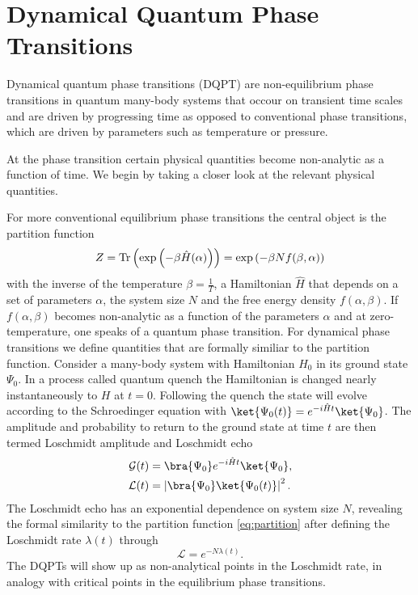\section{Dynamical Quantum Phase Transitions}
Dynamical quantum phase transitions (DQPT) are non-equilibrium phase transitions in quantum many-body systems that occour on transient time scales and are driven by progressing time as opposed to conventional phase transitions, which are driven by parameters such as temperature or pressure. 

At the phase transition certain physical quantities become non-analytic as a function of time. We begin by taking a closer look at the relevant physical quantities.

For more conventional equilibrium phase transitions the central object is the partition function
\begin{equation}
    \label{eq:partition}
    Z = \mathrm{Tr}\left(\exp\left(-\beta\hat{H}(\alpha)\right)\right)= \exp\left(-\beta Nf(\beta,\alpha)\right)
\end{equation}
with the inverse of the temperature $\beta=\frac{1}{T}$, a Hamiltonian $\hat{H}$ that depends on a set of parameters $\alpha$, the system size $N$ and the free energy density $f(\alpha,\beta)$. If $f(\alpha,\beta)$ becomes non-analytic as a function of the parameters $\alpha$ and at zero-temperature, one speaks of a quantum phase transition. For dynamical phase transitions we define quantities that are formally similiar to the partition function. Consider a many-body system with Hamiltonian $H_0$ in its ground state $\Psi_0$. In a process called quantum quench the Hamiltonian is changed nearly instantaneously to $H$ at $t = 0$. Following the quench the state will evolve according to the Schroedinger equation with $\ket{\Psi_0(t)} = e^{-i\hat{H}t}\ket{\Psi_0}$. The amplitude and probability to return to the ground state at time $t$ are then termed Loschmidt amplitude and Loschmidt echo
\begin{align}
    \mathcal{G}(t) &= \bra{\Psi_0}e^{-i\hat{H}t}\ket{\Psi_0}, \\
    \mathcal{L}(t) &= \left|\bra{\Psi_0}\ket{\Psi_0(t)}\right|^2 .
\end{align}
The Loschmidt echo has an exponential dependence on system size $N$, revealing the formal similarity to the partition function \eqref{eq:partition} after defining the Loschmidt rate $\lambda(t)$ through
\begin{equation}
    \mathcal{L} = e^{-N\lambda(t)}.
\end{equation}
The DQPTs will show up as non-analytical points in the Loschmidt rate, in analogy with critical points in the equilibrium phase transitions.
